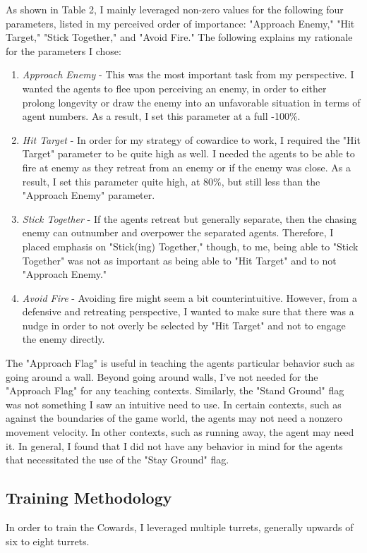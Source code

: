 \documentclass{article} %
\begin{document}
As shown in Table 2, I mainly leveraged non-zero values for the following four parameters, listed in my perceived order of importance: "Approach Enemy," "Hit Target," "Stick Together," and "Avoid Fire." The following explains my rationale for the parameters I chose:

\begin{enumerate}
\item \textit{Approach Enemy} - This was the most important task from my perspective. I wanted the agents to flee upon perceiving an enemy, in order to either prolong longevity or draw the enemy into an unfavorable situation in terms of agent numbers. As a result, I set this parameter at a full -100\%.
\item \textit{Hit Target} - In order for my strategy of cowardice to work, I required the "Hit Target" parameter to be quite high as well. I needed the agents to be able to fire at enemy as they retreat from an enemy or if the enemy was close. As a result, I set this parameter quite high, at 80\%, but still less than the "Approach Enemy" parameter.
\item \textit{Stick Together} - If the agents retreat but generally separate, then the chasing enemy can outnumber and overpower the separated agents. Therefore, I placed emphasis on "Stick(ing) Together," though, to me, being able to "Stick Together" was not as important as being able to "Hit Target" and to not "Approach Enemy."
\item \textit{Avoid Fire} - Avoiding fire might seem a bit counterintuitive. However, from a defensive and retreating perspective, I wanted to make sure that there was a nudge in order to not overly be selected by "Hit Target" and not to engage the enemy directly.
\end{enumerate}

The "Approach Flag" is useful in teaching the agents particular behavior such as going around a wall. Beyond going around walls, I've not needed for the "Approach Flag" for any teaching contexts. Similarly, the "Stand Ground" flag was not something I saw an intuitive need to use. In certain contexts, such as against the boundaries of the game world, the agents may not need a nonzero movement velocity. In other contexts, such as running away, the agent may need it. In general, I found that I did not have any behavior in mind for the agents that necessitated the use of the "Stay Ground" flag.

\subsection{Training Methodology}
In order to train the Cowards, I leveraged multiple turrets, generally upwards of six to eight turrets. 
\end{document}
